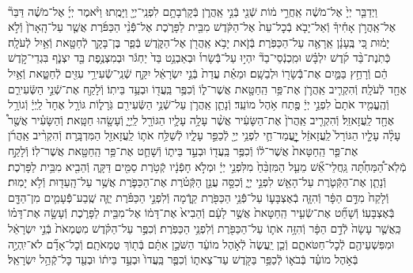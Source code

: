 \documentclass[twoside, openany, parskip=half, 11pt]{book}
\begin{document}
\begin{sometimes}
\begin{footnotesize}
\begin{multicols}{2}
\\
וַיְדַבֵּ֤ר יְיָ֙ אֶל־מֹשֶׁ֔ה אַֽחֲרֵ֣י מ֔וֹת שְֿׁנֵ֖י בְּֿנֵ֣י אַֽהֲרֹ֑ן בְּֿקָרְֿבָתָ֥ם לִפְנֵֽי־יְיָ֖ וַיָּמֻֽתוּ׃ וַיֹּ֨אמֶר יְיָ֜ אֶל־מֹשֶׁ֗ה דַּבֵּר֘ אֶל־אַֽהֲרֹ֣ן אָחִ֒יךָ֒ וְֿאַל־יָבֹ֤א בְֿכׇל־עֵת֙ אֶל־הַקֹּ֔דֶשׁ מִבֵּ֖ית לַפָּרֹ֑כֶת אֶל־פְּֿֿנֵ֨י הַכַּפֹּ֜רֶת אֲשֶׁ֤ר עַל־הָֽאָרֹן֙ וְֿלֹ֣א יָמ֔וּת כִּ֚י בֶּֽעָנָ֔ן אֵֽרָאֶ֖ה עַל־הַכַּפֹּֽרֶת׃ בְּֿזֹ֛את יָבֹ֥א אַֽהֲרֹ֖ן אֶל־הַקֹּ֑דֶשׁ בְּֿפַ֧ר בֶּן־בָּקָ֛ר לְֿחַטָּ֖את וְֿאַ֥יִל לְֿעֹלָֽה׃ כְּֿתֹֽנֶת־בַּ֨ד קֹ֜דֶשׁ יִלְבָּ֗שׁ וּמִֽכְנְֿסֵי־בַד֘ יִהְי֣וּ עַל־בְּֿֿשָׂרוֹ֒ וּבְאַבְנֵ֥ט בַּד֙ יַחְגֹּ֔ר וּבְמִצְנֶ֥פֶת בַּ֖ד יִצְנֹ֑ף בִּגְדֵי־קֹ֣דֶשׁ הֵ֔ם וְֿרָחַ֥ץ בַּמַּ֛יִם אֶת־בְּֿֿשָׂר֖וֹ וּלְבֵשָֽׁם׃ וּמֵאֵ֗ת עֲדַת֙ בְּֿנֵ֣י יִשְׂרָאֵ֔ל יִקַּ֛ח שְֿׁנֵֽי־שְֿֿׂעִירֵ֥י עִזִּ֖ים לְֿחַטָּ֑את וְֿאַ֥יִל אֶחָ֖ד לְֿעֹלָֽה׃ וְֿהִקְרִ֧יב אַֽהֲרֹ֛ן אֶת־פַּ֥ר הַֽחַטָּ֖את אֲשֶׁר־ל֑וֹ וְֿכִפֶּ֥ר בַּֽעֲד֖וֹ וּבְעַ֥ד בֵּיתֽוֹ׃  וְֿלָקַ֖ח אֶת־שְֿׁנֵ֣י הַשְּֿׂעִירִ֑ם וְֿהֶֽעֱמִ֤יד אֹתָם֙ לִפְנֵ֣י יְיָ֔ פֶּ֖תַח אֹ֥הֶל מוֹעֵֽד׃ וְֿנָתַ֧ן אַֽהֲרֹ֛ן עַל־שְֿׁנֵ֥י הַשְּֿׂעִירִ֖ם גֹּֽרָל֑וֹת גּוֹרָ֤ל אֶחָד֙ לַֽיְיָ֔ וְֿגוֹרָ֥ל אֶחָ֖ד לַֽעֲזָאזֵֽל׃ וְֿהִקְרִ֤יב אַֽהֲרֹן֙ אֶת־הַשָּׂעִ֔יר אֲשֶׁ֨ר עָלָ֥ה עָלָ֛יו הַגּוֹרָ֖ל לַֽיְיָ֑ וְֿעָשָׂ֖הוּ חַטָּֽאת׃ וְֿהַשָּׂעִ֗יר אֲשֶׁ֖ר֩ עָלָ֨ה עָלָ֤יו הַגּוֹרָל֙ לַֽעֲזָאזֵ֔ל יׇׇׇׇׇׇׇׇׇׇׇׇׇׇׇׇׇׇׇׇָֽעֳמַד־חַ֛י לִפְנֵ֥י יְיָ֖ לְֿכַפֵּ֣ר עָלָ֑יו לְֿשַׁלַּ֥ח אֹת֛וֹ לַֽעֲזָאזֵ֖ל הַמִּדְבָּֽרָה׃ וְֿהִקְרִ֨יב אַֽהֲרֹ֜ן אֶת־פַּ֤ר הַֽחַטָּאת֙ אֲשֶׁר־ל֔וֹ וְֿכִפֶּ֥ר בַּֽעֲד֖וֹ וּבְעַ֣ד בֵּית֑וֹ וְֿשָׁחַ֛ט אֶת־פַּ֥ר הַֽחַטָּ֖את אֲשֶׁר־לֽוֹ׃  וְֿלָקַ֣ח מְֿלֹֽא־הַ֠מַּחְתָּ֠ה גַּֽחֲלֵי־אֵ֞שׁ מֵעַ֤ל הַמִּזְבֵּ֨חַ֙ מִלִּפְנֵ֣י יְיָ֔ וּמְלֹ֣א חָפְֿנָ֔יו קְֿטֹ֥רֶת סַמִּ֖ים דַּקָּ֑ה וְֿהֵבִ֖יא מִבֵּ֥ית לַפָּרֹֽכֶת׃ וְֿנָתַ֧ן אֶת־הַקְּֿטֹ֛רֶת עַל־הָאֵ֖שׁ לִפְנֵ֣י יְיָ֑ וְֿכִסָּ֣ה עֲנַ֣ן הַקְּֿטֹ֗רֶת אֶת־הַכַּפֹּ֛רֶת אֲשֶׁ֥ר עַל־הָֽעֵד֖וּת וְֿלֹ֥א יָמֽוּת׃ וְֿלָקַח֙ מִדַּ֣ם הַפָּ֔ר וְֿהִזָּ֧ה בְֿאֶצְבָּע֛וֹ עַל־פְּֿֿנֵ֥י הַכַּפֹּ֖רֶת קֵ֑דְֿמָה וְֿלִפְנֵ֣י הַכַּפֹּ֗רֶת יַזֶּ֧ה שֶֽׁבַע־פְּֿֿעָמִ֛ים מִן־הַדָּ֖ם בְּֿאֶצְבָּעֽוֹ׃ וְֿשָׁחַ֞ט אֶת־שְֿׂעִ֤יר הַֽחַטָּאת֙ אֲשֶׁ֣ר לָעָ֔ם וְֿהֵבִיא֙ אֶת־דָּמ֔וֹ אֶל־מִבֵּ֖ית לַפָּרֹ֑כֶת וְֿעָשָׂ֣ה אֶת־דָּמ֗וֹ כַּֽאֲשֶׁ֤ר עָשָׂה֙ לְֿדַ֣ם הַפָּ֔ר וְֿהִזָּ֥ה אֹת֛וֹ עַל־הַכַּפֹּ֖רֶת וְֿלִפְנֵ֥י הַכַּפֹּֽרֶת׃ וְֿכִפֶּ֣ר עַל־הַקֹּ֗דֶשׁ מִטֻּמְאֹת֙ בְּֿנֵ֣י יִשְׂרָאֵ֔ל וּמִפִּשְׁעֵיהֶ֖ם לְֿכׇל־חַטֹּאתָ֑ם וְֿכֵ֤ן יַֽעֲשֶׂה֙ לְֿאֹ֣הֶל מוֹעֵ֔ד הַשֹּׁכֵ֣ן אִתָּ֔ם בְּֿת֖וֹךְ טֻמְאֹתָֽם׃ וְֿכׇל־אָדָ֞ם לֹא־יִֽהְיֶ֣ה בְּֿאֹ֣הֶל מוֹעֵ֗ד בְּֿבֹא֛וֹ לְֿכַפֵּ֥ר בַּקֹּ֖דֶשׁ עַד־צֵאת֑וֹ וְֿכִפֶּ֤ר בַּֽעֲדוֹ֙ וּבְעַ֣ד בֵּית֔וֹ וּבְעַ֖ד כׇּל־קְֿהַ֥ל יִשְׂרָאֵֽל׃


\end{multicols}
\end{footnotesize}
\end{sometimes}
\end{document}
